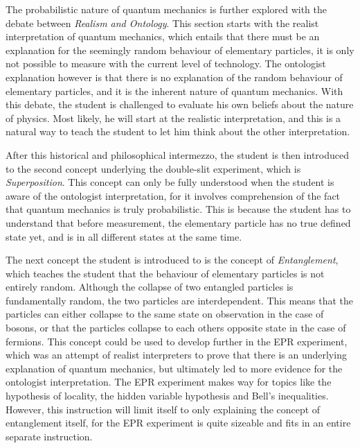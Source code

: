 \documentclass[11pt,twoside]{report} %
\begin{document}
The probabilistic nature of quantum mechanics is further explored with the debate between \emph{Realism and Ontology}. This section starts with the realist interpretation of quantum mechanics, which entails that there must be an explanation for the seemingly random behaviour of elementary particles, it is only not possible to measure with the current level of technology. The ontologist explanation however is that there is no explanation of the random behaviour of elementary particles, and it is the inherent nature of quantum mechanics. With this debate, the student is challenged to evaluate his own beliefs about the nature of physics. Most likely, he will start at the realistic interpretation, and this is a natural way to teach the student to let him think about the other interpretation.

After this historical and philosophical intermezzo, the student is then introduced to the second concept underlying the double-slit experiment, which is \emph{Superposition}. This concept can only be fully understood when the student is aware of the ontologist interpretation, for it involves comprehension of the fact that quantum mechanics is truly probabilistic. This is because the student has to understand that before measurement, the elementary particle has no true defined state yet, and is in all different states at the same time.

The next concept the student is introduced to is the concept of \emph{Entanglement}, which teaches the student that the behaviour of elementary particles is not entirely random. Although the collapse of two entangled particles is fundamentally random, the two particles are interdependent. This means that the particles can either collapse to the same state on observation in the case of bosons, or that the particles collapse to each others opposite state in the case of fermions. This concept could be used to develop further in the EPR experiment, which was an attempt of realist interpreters to prove that there is an underlying explanation of quantum mechanics, but ultimately led to more evidence for the ontologist interpretation. The EPR experiment makes way for topics like the hypothesis of locality, the hidden variable hypothesis and Bell's inequalities. However, this instruction will limit itself to only explaining the concept of entanglement itself, for the EPR experiment is quite sizeable and fits in an entire separate instruction.
\end{document}
